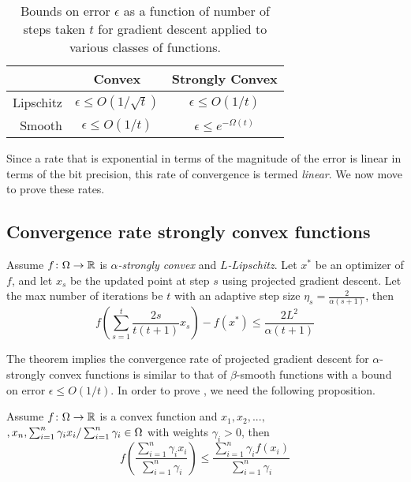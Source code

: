 \begin{table}[h]
    \centering
    \begin{tabular}{|r|c|c|}
        \hline
         & Convex & Strongly Convex\\
        \hline
         Lipschitz & $\epsilon \leq O(1/\sqrt{t})$
         & $\epsilon \leq O(1/t)$ \\
         \hline
         Smooth & $\epsilon \leq O(1/t)$
         & $\epsilon \leq e^{-\Omega(t)}$ \\
         \hline
    \end{tabular}
    \caption{Bounds on error $\epsilon$
    as a function of number of steps taken $t$
    for gradient descent applied to various classes of functions.}
    \label{tab:proofs}
\end{table}

Since a rate that is exponential in terms of the magnitude of the error is
linear in terms of the bit precision, this rate of convergence is termed
\emph{linear}.  We now move to prove these rates.

\subsection{Convergence rate strongly convex functions}

\begin{theorem} 
Assume $f\colon\Omega\to\mathbb{R}$ is \emph{$\alpha$-strongly convex} and
\emph{$L$-Lipschitz}. Let $x^{*}$ be an optimizer of $f$, and let $x_{s}$ be the
updated point at step $s$ using projected gradient descent. Let the max number
of iterations be $t$ with an adaptive step size $\eta_{s} =
\frac{2}{\alpha(s+1)}$, then 
\[
f\left(\sum_{s=1}^{t}\frac{2s}{t(t+1)}x_{s}\right) - f(x^{*})\leq\frac{2 L^{2}}{\alpha(t+1)}
\]
\end{theorem}

The theorem implies the convergence rate of projected gradient descent for
$\alpha$-strongly convex functions is similar to that of $\beta$-smooth
functions with a bound on error $\epsilon \leq O(1/t)$.  In order to prove
, we need the following proposition.

\begin{proposition}
Assume $f\colon\Omega\to\mathbb{R}$ is a convex function and $x_{1}, x_{2}, ...,$\\
$,x_{n},\sum_{i=1}^{n}\gamma_{i}x_{i}/\sum_{i=1}^{n}\gamma_{i}\in\Omega$ with weights $\gamma_{i} > 0$, then
\[
f\left(\frac{\sum_{i=1}^{n}\gamma_{i}x_{i}}{\sum_{i=1}^{n}\gamma_{i}}\right) \leq \frac{\sum_{i=1}^{n}\gamma_{i}f(x_{i})}{\sum_{i=1}^{n}\gamma_{i}}
\]
\end{proposition}

